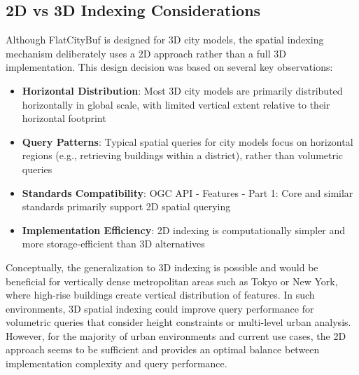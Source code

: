 \subsection{2D vs 3D Indexing Considerations}
\label{methodology:spatial_index:2d_vs_3d_indexing}

Although FlatCityBuf is designed for 3D city models, the spatial indexing mechanism deliberately uses a 2D approach rather than a full 3D implementation. This design decision was based on several key observations:

\begin{itemize}
  \item \textbf{Horizontal Distribution}: Most 3D city models are primarily distributed horizontally in global scale, with limited vertical extent relative to their horizontal footprint
  \item \textbf{Query Patterns}: Typical spatial queries for city models focus on horizontal regions (e.g., retrieving buildings within a district), rather than volumetric queries
  \item \textbf{Standards Compatibility}: OGC API - Features - Part 1: Core \citep{ogc_api_2019} and similar standards primarily support 2D spatial querying
  \item \textbf{Implementation Efficiency}: 2D indexing is computationally simpler and more storage-efficient than 3D alternatives
\end{itemize}

Conceptually, the generalization to 3D indexing is possible and would be beneficial for vertically dense metropolitan areas such as Tokyo or New York, where high-rise buildings create vertical distribution of features. In such environments, 3D spatial indexing could improve query performance for volumetric queries that consider height constraints or multi-level urban analysis. However, for the majority of urban environments and current use cases, the 2D approach seems to be sufficient and provides an optimal balance between implementation complexity and query performance.
